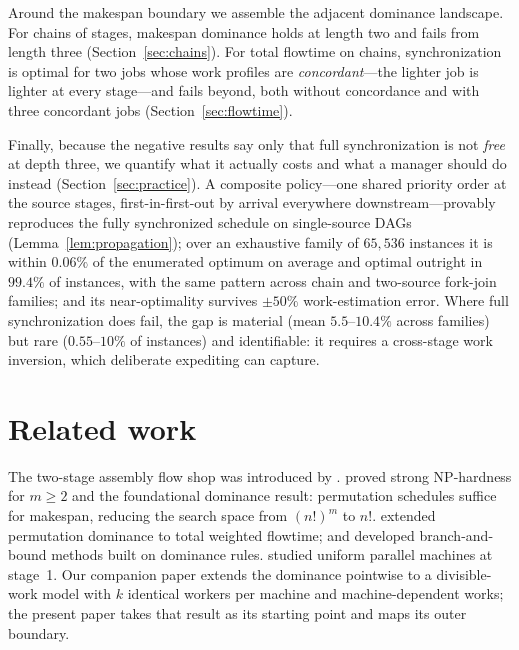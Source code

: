 \documentclass[sn-mathphys,NameDate]{sn-jnl}
\theoremstyle{thmstyleone}
\theoremstyle{thmstylethree}
\theoremstyle{thmstyletwo}
\begin{document}
Around the makespan boundary we assemble the adjacent
dominance landscape. For chains of stages, makespan dominance
holds at length two and fails from length three
(Section~\ref{sec:chains}). For total flowtime on chains,
synchronization is optimal for two jobs whose work profiles
are \emph{concordant}---the lighter job is lighter at every
stage---and fails beyond, both without concordance and with
three concordant jobs (Section~\ref{sec:flowtime}).

Finally, because the negative results say only that full
synchronization is not \emph{free} at depth three, we quantify
what it actually costs and what a manager should do instead
(Section~\ref{sec:practice}). A composite policy---one shared
priority order at the source stages, first-in-first-out by
arrival everywhere downstream---provably reproduces the fully
synchronized schedule on single-source DAGs
(Lemma~\ref{lem:propagation}); over an exhaustive family of
$65{,}536$ instances it is within $0.06\%$ of the enumerated
optimum on average and optimal outright in $99.4\%$ of
instances, with the same pattern across chain and two-source
fork-join families; and its near-optimality survives
$\pm 50\%$ work-estimation error. Where full synchronization
does fail, the gap is material (mean $5.5$--$10.4\%$ across
families) but rare ($0.55$--$10\%$ of instances) and
identifiable: it requires a cross-stage work inversion, which
deliberate expediting can capture.

\section{Related work}
\label{sec:related}

The two-stage assembly flow shop was introduced by
\citet{lee1993}. \citet{potts1995} proved strong NP-hardness
for $m \geq 2$ and the foundational dominance result:
permutation schedules suffice for makespan, reducing the
search space from $(n!)^m$ to $n!$. \citet{tozkapan2003}
extended permutation dominance to total weighted flowtime;
\citet{hariri1997} and \citet{hadda2024} developed
branch-and-bound methods built on dominance rules.
\citet{koulamas2007} studied uniform parallel machines at
stage~1. Our companion paper \citep{bowmanA} extends the
dominance pointwise to a divisible-work model with $k$
identical workers per machine and machine-dependent works;
the present paper takes that result as its starting point and
maps its outer boundary.
\end{document}
